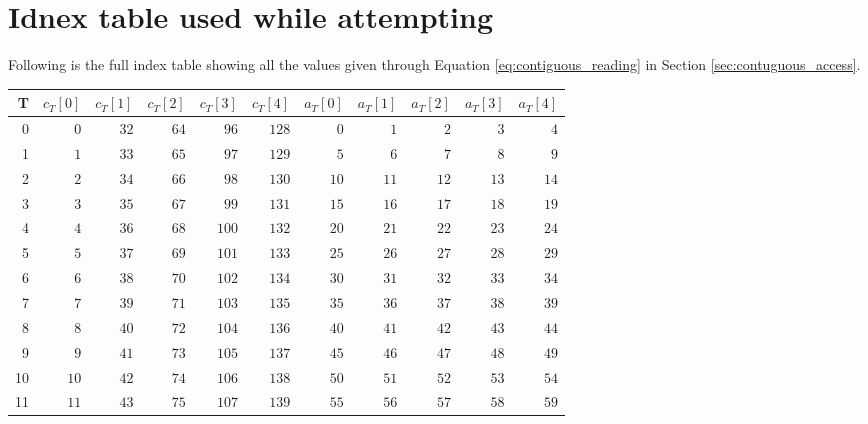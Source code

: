 \section{Idnex table used while attempting }
Following is the full index table showing all the values given through Equation \ref{eq:contiguous_reading} in Section \ref{sec:contuguous_access}.

\begin{table}[H]
    \small
    \begin{tabular}{r|rrrrr|rrrrr}
        T  & $c_T[0]$ & $c_T[1]$ & $c_T[2]$ & $c_T[3]$ & $c_T[4]$ & $a_T[0]$ & $a_T[1]$ & $a_T[2]$ & $a_T[3]$ & $a_T[4]$ \\
        \hline

        0  & $0$      & $32$     & $64$     & $96$     & $128$    & $0$      & $1$      & $2$      & $3$      & $4$      \\
        1  & $1$      & $33$     & $65$     & $97$     & $129$    & $5$      & $6$      & $7$      & $8$      & $9$      \\
        2  & $2$      & $34$     & $66$     & $98$     & $130$    & $10$     & $11$     & $12$     & $13$     & $14$     \\
        3  & $3$      & $35$     & $67$     & $99$     & $131$    & $15$     & $16$     & $17$     & $18$     & $19$     \\
        4  & $4$      & $36$     & $68$     & $100$    & $132$    & $20$     & $21$     & $22$     & $23$     & $24$     \\
        5  & $5$      & $37$     & $69$     & $101$    & $133$    & $25$     & $26$     & $27$     & $28$     & $29$     \\
        6  & $6$      & $38$     & $70$     & $102$    & $134$    & $30$     & $31$     & $32$     & $33$     & $34$     \\
        7  & $7$      & $39$     & $71$     & $103$    & $135$    & $35$     & $36$     & $37$     & $38$     & $39$     \\
        8  & $8$      & $40$     & $72$     & $104$    & $136$    & $40$     & $41$     & $42$     & $43$     & $44$     \\
        9  & $9$      & $41$     & $73$     & $105$    & $137$    & $45$     & $46$     & $47$     & $48$     & $49$     \\
        10 & $10$     & $42$     & $74$     & $106$    & $138$    & $50$     & $51$     & $52$     & $53$     & $54$     \\
        11 & $11$     & $43$     & $75$     & $107$    & $139$    & $55$     & $56$     & $57$     & $58$     & $59$     \\

\end{tabular}
\end{table}

